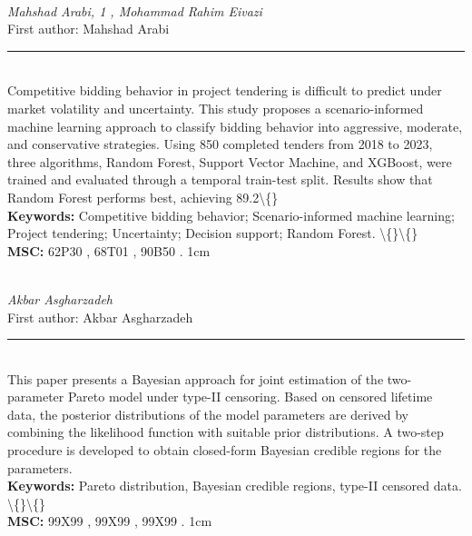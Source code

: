 \documentclass[10pt,twoside]{article}
\begin{document}
\noindent\begin{minipage}[t][\textheight]{\textwidth}
\\[0.35em]
{\itshape Mahshad Arabi, 1 , Mohammad Rahim Eivazi}\\[0.2em]
{\footnotesize First author: Mahshad Arabi}\\[0.45em]
\noindent\rule{\textwidth}{0.3pt}\\[0.4em]
{\footnotesize  Competitive bidding behavior in project tendering is difficult to predict under market volatility and uncertainty. This study proposes a scenario-informed machine learning approach to classify bidding behavior into aggressive, moderate, and conservative strategies. Using 850 completed tenders from 2018 to 2023, three algorithms, Random Forest, Support Vector Machine, and XGBoost, were trained and evaluated through a temporal train-test split. Results show that Random Forest performs best, achieving 89.2\textbackslash\{\}}\\[0.4em]
{\footnotesize\bfseries Keywords:} {\footnotesize Competitive bidding behavior; Scenario-informed machine learning; Project tendering; Uncertainty; Decision support; Random Forest. \textbackslash\{\}\textbackslash\{\}}\\[0.15em]
{\footnotesize\bfseries MSC:} {\footnotesize 62P30 , 68T01 , 90B50 . 1cm}\\
\vfill
\end{minipage}
\newpage

\noindent\begin{minipage}[t][\textheight]{\textwidth}
\\[0.35em]
{\itshape Akbar Asgharzadeh}\\[0.2em]
{\footnotesize First author: Akbar Asgharzadeh}\\[0.45em]
\noindent\rule{\textwidth}{0.3pt}\\[0.4em]
{\footnotesize  This paper presents a Bayesian approach for joint estimation of the two-parameter Pareto model under type-II censoring. Based on censored lifetime data, the posterior distributions of the model parameters are derived by combining the likelihood function with suitable prior distributions. A two-step procedure is developed to obtain closed-form Bayesian credible regions for the parameters.}\\[0.4em]
{\footnotesize\bfseries Keywords:} {\footnotesize Pareto distribution, Bayesian credible regions, type-II censored data. \textbackslash\{\}\textbackslash\{\}}\\[0.15em]
{\footnotesize\bfseries MSC:} {\footnotesize 99X99 , 99X99 , 99X99 . 1cm}\\
\vfill
\end{minipage}
\newpage
\end{document}
